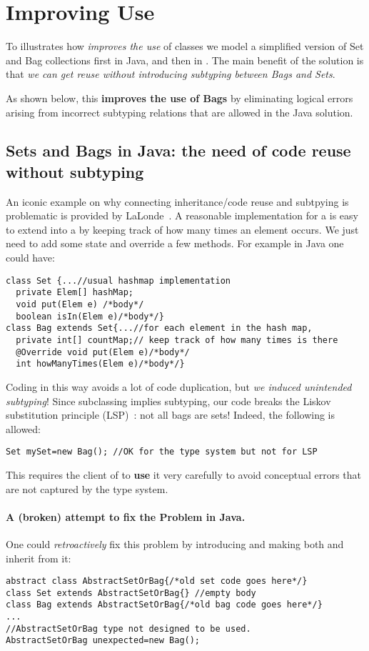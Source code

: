 \section{Improving Use}

To illustrates how 
\name \emph{improves the use} of classes we model a simplified version of
Set and Bag collections first in Java, and then in \name.
The main benefit of the \name solution is that \emph{we can get reuse 
without introducing subtyping between Bags and Sets}. 

As shown below, this \textbf{improves the 
use of Bags} by eliminating logical errors arising from incorrect
subtyping relations that are allowed in the Java solution. 

\subsection{Sets and Bags in Java: the need of code reuse without subtyping}
An iconic example on why connecting inheritance/code reuse and
subtpying is problematic is provided by
LaLonde~\cite{LaLonde:1991:SSS:110673.110679}.  A reasonable
implementation for a \Q@Set@ is easy to extend into a \Q@Bag@ by
keeping track of how many times an element occurs.  We just need to
add some state and override a few methods.
For example in Java one could have:

\begin{lstlisting}
class Set {...//usual hashmap implementation
  private Elem[] hashMap;
  void put(Elem e) /*body*/
  boolean isIn(Elem e)/*body*/}
class Bag extends Set{...//for each element in the hash map,
  private int[] countMap;// keep track of how many times is there
  @Override void put(Elem e)/*body*/
  int howManyTimes(Elem e)/*body*/}
\end{lstlisting}

\noindent Coding \Q@Bag@ in this way avoids a lot of code
duplication, but \emph{we induced unintended subtyping}! 
Since subclassing implies subtyping, our code breaks the Liskov substitution principle (LSP)~\cite{martin2000design}: not all bags are sets!
Indeed, the following is allowed:

\begin{lstlisting}
Set mySet=new Bag(); //OK for the type system but not for LSP
\end{lstlisting}
This requires the client of \Q@Bag@ to \textbf{use} it very carefully to
avoid conceptual errors that are not captured by the type system.


\paragraph{A (broken) attempt to fix the Problem in Java.}
One could \emph{retroactively} fix this problem by introducing \Q@AbstractSetOrBag@
and making both \Q@Bag@ and \Q@Set@ inherit from it:
\begin{lstlisting}
abstract class AbstractSetOrBag{/*old set code goes here*/}
class Set extends AbstractSetOrBag{} //empty body
class Bag extends AbstractSetOrBag{/*old bag code goes here*/}
...
//AbstractSetOrBag type not designed to be used.
AbstractSetOrBag unexpected=new Bag(); 
\end{lstlisting}

